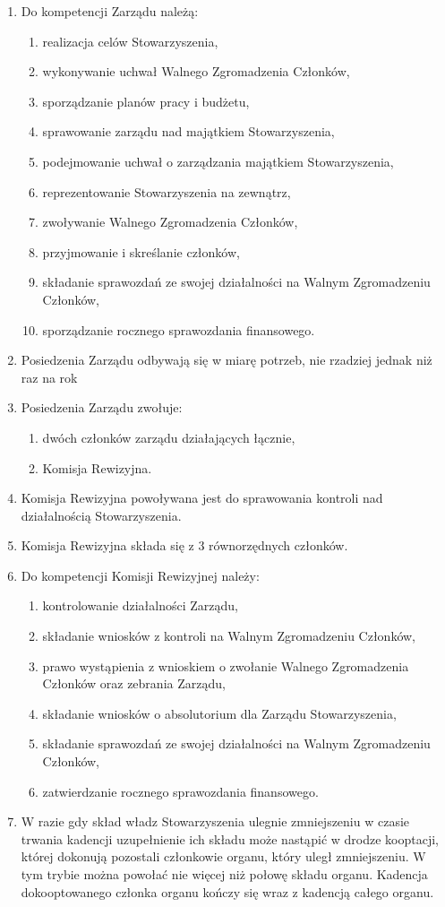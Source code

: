 \documentclass{article}
\begin{document}
\begin{enumerate}
    \item Do kompetencji Zarządu należą:
      \begin{enumerate}
        \item realizacja celów Stowarzyszenia,
        \item wykonywanie uchwał Walnego Zgromadzenia Członków,
        \item sporządzanie planów pracy i budżetu,
        \item sprawowanie zarządu nad majątkiem Stowarzyszenia,
        \item podejmowanie uchwał o zarządzania majątkiem Stowarzyszenia,
        \item reprezentowanie Stowarzyszenia na zewnątrz,
        \item zwoływanie Walnego Zgromadzenia Członków,
        \item przyjmowanie i skreślanie członków,
        \item składanie sprawozdań ze swojej działalności na Walnym Zgromadzeniu Członków,
        \item sporządzanie rocznego sprawozdania finansowego.
      \end{enumerate}
    \item Posiedzenia Zarządu odbywają się w miarę potrzeb, nie rzadziej jednak niż raz na rok
    \item Posiedzenia Zarządu zwołuje:
      \begin{enumerate}
        \item dwóch członków zarządu działających łącznie,
        \item Komisja Rewizyjna.
      \end{enumerate}
    \item Komisja Rewizyjna powoływana jest do sprawowania kontroli nad działalnością Stowarzyszenia.
    \item Komisja Rewizyjna składa się z 3 równorzędnych członków.
    \item Do kompetencji Komisji Rewizyjnej należy:
      \begin{enumerate}
        \item kontrolowanie działalności Zarządu,
        \item składanie wniosków z kontroli na Walnym Zgromadzeniu Członków,
        \item prawo wystąpienia z wnioskiem o zwołanie Walnego Zgromadzenia Członków oraz zebrania Zarządu,
        \item składanie wniosków o absolutorium dla Zarządu Stowarzyszenia,
        \item składanie sprawozdań ze swojej działalności na Walnym Zgromadzeniu Członków,
        \item zatwierdzanie rocznego sprawozdania finansowego.
      \end{enumerate}
    \item W razie gdy skład władz Stowarzyszenia ulegnie zmniejszeniu w czasie trwania kadencji uzupełnienie ich składu może nastąpić w drodze kooptacji, której dokonują pozostali członkowie organu, który uległ zmniejszeniu. W tym trybie można powołać nie więcej niż połowę składu organu. Kadencja dokooptowanego członka organu kończy się wraz z kadencją całego organu.
  \end{enumerate}
\end{document}
